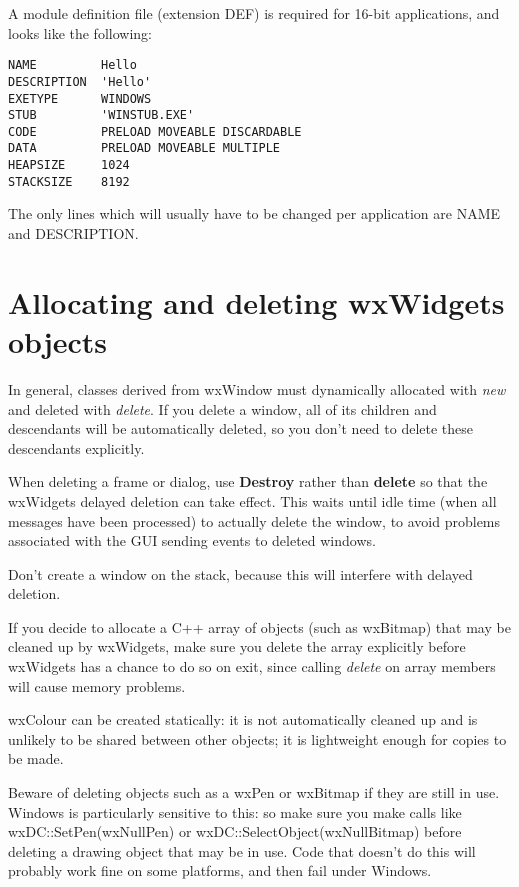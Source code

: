 A module definition file (extension DEF) is required for 16-bit applications, and
looks like the following:

\begin{verbatim}
NAME         Hello
DESCRIPTION  'Hello'
EXETYPE      WINDOWS
STUB         'WINSTUB.EXE'
CODE         PRELOAD MOVEABLE DISCARDABLE
DATA         PRELOAD MOVEABLE MULTIPLE
HEAPSIZE     1024
STACKSIZE    8192
\end{verbatim}

The only lines which will usually have to be changed per application are
NAME and DESCRIPTION.

\section{Allocating and deleting wxWidgets objects}

In general, classes derived from wxWindow must dynamically allocated
with {\it new} and deleted with {\it delete}. If you delete a window,
all of its children and descendants will be automatically deleted,
so you don't need to delete these descendants explicitly.

When deleting a frame or dialog, use {\bf Destroy} rather than {\bf delete} so
that the wxWidgets delayed deletion can take effect. This waits until idle time
(when all messages have been processed) to actually delete the window, to avoid
problems associated with the GUI sending events to deleted windows.

Don't create a window on the stack, because this will interfere
with delayed deletion.

If you decide to allocate a C++ array of objects (such as wxBitmap) that may
be cleaned up by wxWidgets, make sure you delete the array explicitly
before wxWidgets has a chance to do so on exit, since calling {\it delete} on
array members will cause memory problems.

wxColour can be created statically: it is not automatically cleaned
up and is unlikely to be shared between other objects; it is lightweight
enough for copies to be made.

Beware of deleting objects such as a wxPen or wxBitmap if they are still in use.
Windows is particularly sensitive to this: so make sure you
make calls like wxDC::SetPen(wxNullPen) or wxDC::SelectObject(wxNullBitmap) before deleting
a drawing object that may be in use. Code that doesn't do this will probably work
fine on some platforms, and then fail under Windows.

